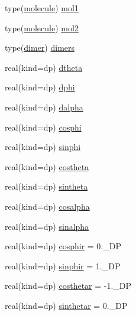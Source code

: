 \begin{DoxyCompactItemize}
\item 
type(\hyperlink{structmod__read__molecules_1_1molecule}{molecule}) \hyperlink{namespacemod__read__molecules_a8511d6e8d8197d2f03d47376a43e50ce}{mol1}
\item 
type(\hyperlink{structmod__read__molecules_1_1molecule}{molecule}) \hyperlink{namespacemod__read__molecules_a73b2cd7c32146644cc496892645c2e68}{mol2}
\item 
type(\hyperlink{structmod__read__molecules_1_1dimer}{dimer}) \hyperlink{namespacemod__read__molecules_a9947a968e59ca99a71fee1f02e557172}{dimers}
\item 
real(kind=dp) \hyperlink{namespacemod__read__molecules_ad9dc9f5af77e0db504939d241333d857}{dtheta}
\item 
real(kind=dp) \hyperlink{namespacemod__read__molecules_a4a9088b19ec4e6043af7894bfa20e87b}{dphi}
\item 
real(kind=dp) \hyperlink{namespacemod__read__molecules_a25040f2691a3f50a481882e7e6a9816d}{dalpha}
\item 
real(kind=dp) \hyperlink{namespacemod__read__molecules_aa56e64086c25d032f85b2528c2dfc698}{cosphi}
\item 
real(kind=dp) \hyperlink{namespacemod__read__molecules_aae35f31c005f89820a9d8806eb04c7c6}{sinphi}
\item 
real(kind=dp) \hyperlink{namespacemod__read__molecules_aecec9abde85a75891e653ded1997b267}{costheta}
\item 
real(kind=dp) \hyperlink{namespacemod__read__molecules_a4bb74ab5f27ab9f8418a9174422796c4}{sintheta}
\item 
real(kind=dp) \hyperlink{namespacemod__read__molecules_ac0e3265d01367c7b422240b7ebc4be85}{cosalpha}
\item 
real(kind=dp) \hyperlink{namespacemod__read__molecules_ac481718cc895478caac0b9b181436fc3}{sinalpha}
\item 
real(kind=dp) \hyperlink{namespacemod__read__molecules_a169468a3161d2d2e074c0acacf22289a}{cosphir} = 0.\+\_\+\+DP
\item 
real(kind=dp) \hyperlink{namespacemod__read__molecules_ab49181669d915cd61bc91b536f9013ed}{sinphir} = 1.\+\_\+\+DP
\item 
real(kind=dp) \hyperlink{namespacemod__read__molecules_afe28a6b2c9ac300c072b7315c4cf36fb}{costhetar} = -\/1.\+\_\+\+DP
\item 
real(kind=dp) \hyperlink{namespacemod__read__molecules_a8f483c69b7c8592ed311a0ba7b816e4a}{sinthetar} = 0.\+\_\+\+DP
\end{DoxyCompactItemize}


